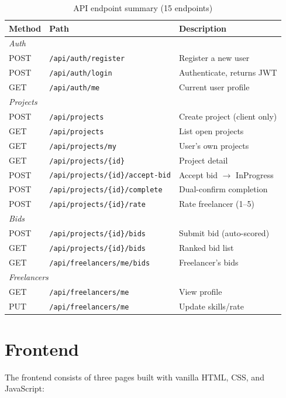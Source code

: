 \documentclass[12pt, a4paper]{report}
\begin{document}
\begin{table}[H]
\centering
\caption{API endpoint summary (15 endpoints)}
\begin{tabular}{@{}llp{7cm}@{}}
\toprule
\textbf{Method} & \textbf{Path} & \textbf{Description} \\
\midrule
\multicolumn{3}{l}{\textit{Auth}} \\
POST & \texttt{/api/auth/register} & Register a new user \\
POST & \texttt{/api/auth/login} & Authenticate, returns JWT \\
GET  & \texttt{/api/auth/me} & Current user profile \\
\midrule
\multicolumn{3}{l}{\textit{Projects}} \\
POST & \texttt{/api/projects} & Create project (client only) \\
GET  & \texttt{/api/projects} & List open projects \\
GET  & \texttt{/api/projects/my} & User's own projects \\
GET  & \texttt{/api/projects/\{id\}} & Project detail \\
POST & \texttt{/api/projects/\{id\}/accept-bid} & Accept bid $\to$ InProgress \\
POST & \texttt{/api/projects/\{id\}/complete} & Dual-confirm completion \\
POST & \texttt{/api/projects/\{id\}/rate} & Rate freelancer (1--5) \\
\midrule
\multicolumn{3}{l}{\textit{Bids}} \\
POST & \texttt{/api/projects/\{id\}/bids} & Submit bid (auto-scored) \\
GET  & \texttt{/api/projects/\{id\}/bids} & Ranked bid list \\
GET  & \texttt{/api/freelancers/me/bids} & Freelancer's bids \\
\midrule
\multicolumn{3}{l}{\textit{Freelancers}} \\
GET  & \texttt{/api/freelancers/me} & View profile \\
PUT  & \texttt{/api/freelancers/me} & Update skills/rate \\
\bottomrule
\end{tabular}
\end{table}

\section{Frontend}

The frontend consists of three pages built with vanilla HTML, CSS, and JavaScript:
\end{document}
